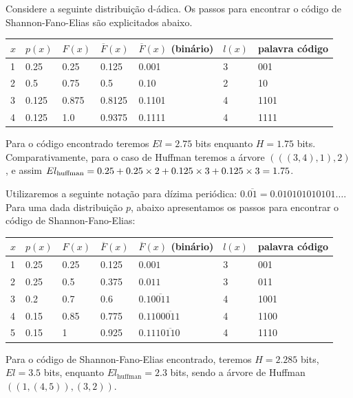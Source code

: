 \begin{example}
Considere a seguinte distribuição d-ádica. Os passos para 
encontrar o código de Shannon-Fano-Elias são explicitados 
abaixo.

\begin{center}
  \begin{tabular}{lllllll}
  $x$ & $p(x)$ & $F(x)$ & $\overline{F}(x)$       & $\overline{F}(x)$ (binário) & $l(x)$ & palavra código \\ \hline
  1   & 0.25   & 0.25   & 0.125           & 0.001                 & 3     & 001   \\
  2   & 0.5    & 0.75   & 0.5             & 0.10                  & 2     & 10    \\
  3   & 0.125  & 0.875  & 0.8125          & 0.1101                & 4     & 1101  \\
  4   & 0.125  & 1.0    & 0.9375          & 0.1111                & 4     & 1111
  \end{tabular}
\end{center}

Para o código encontrado teremos $El = 2.75$ bits enquanto $H=1.75$ bits. 
Comparativamente, para o caso de Huffman teremos a árvore $(((3,4),1),2)$, 
e assim $El_{\text{huffman}} = 0.25 \time 1 + 0.25 \times 2 + 0.125 \times 3 + 0.125 \times 3 = 1.75$.
\end{example}


\begin{example}
Utilizaremos a seguinte notação para dízima periódica: $0.\overline{01} = 0.010101010101\ldots$.
Para uma dada distribuição $p$, abaixo apresentamos os passos para
encontrar o código de Shannon-Fano-Elias:

\begin{center}
  \begin{tabular}{lllllll}
  $x$ & $p(x)$ & $F(x)$ & $\overline{F}(x)$    & $\overline{F}(x)$ (binário) & $l(x)$ & palavra código \\ \hline
  1   & 0.25   & 0.25   & 0.125           & $0.001$                 & 3     & 001   \\
  2   & 0.25   & 0.5    & 0.375           & $0.011$                 & 3     & 011   \\
  3   & 0.2    & 0.7    & 0.6             & $0.1\overline{0011}$         & 4     & 1001  \\
  4   & 0.15   & 0.85   & 0.775           & $0.110\overline{0011}$       & 4     & 1100  \\
  5   & 0.15   & 1      & 0.925           & $0.111\overline{0110}$          & 4     & 1110
  \end{tabular}
\end{center}
Para o código de Shannon-Fano-Elias encontrado, teremos $H=2.285$ bits, $El = 3.5$ bits, 
enquanto $El_{\text{huffman}} = 2.3$ bits, sendo a árvore de Huffman $((1,(4,5)),(3,2))$.
\end{example}
















